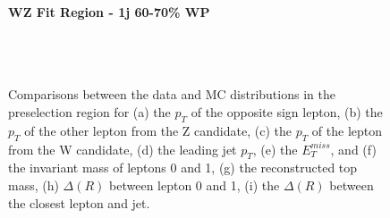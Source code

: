 \begin{figure}[H] 
    \centering
    \textbf{WZ Fit Region - 1j 60-70\% WP}\\
    \\
    \\
    \\
    \caption{Comparisons between the data and MC distributions in the preselection region for (a) the $p_T$ of the opposite sign lepton, (b) the $p_T$ of the other lepton from the Z candidate, (c) the $p_T$ of the lepton from the W candidate, (d) the leading jet $p_T$, (e) the $E_T^{miss}$, and (f) the invariant mass of leptons 0 and 1, (g) the reconstructed top mass, (h) $\Delta(R)$  between lepton 0 and 1, (i) the $\Delta(R)$ between the closest lepton and jet.}
    \label{kin:WP_1j_60_70}
\end{figure}

